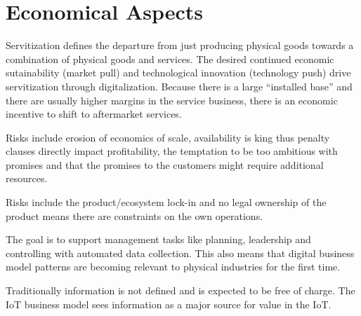 \section{Economical Aspects}
\begin{mytitle}[Servitization] Servitization defines the departure from just producing physical goods towards a combination of physical goods and services. The desired continued economic sutainability (market pull) and technological innovation (technology push) drive servitization through digitalization. Because there is a large ``installed base'' and there are usually higher margins in the service business, there is an economic incentive to shift to aftermarket services.
\end{mytitle}
\begin{mytitle}
    \begin{mysubtitle} Risks include erosion of economics of scale, availability is king thus penalty clauses directly impact profitability, the temptation to be too ambitious with promises and that the promises to the customers might require additional resources.
    \end{mysubtitle}
    \begin{mysubtitle} Risks include the product/ecosystem lock-in and no legal ownership of the product means there are constraints on the own operations.
    \end{mysubtitle}
\end{mytitle}

\begin{mytitle} The goal is to support management tasks like planning, leadership and controlling with automated data collection. This also means that digital business model patterns are becoming relevant to physical industries for the first time. 
\end{mytitle}
\begin{myremark} Traditionally information is not defined and is expected to be free of charge. The IoT business model sees information as a major source for value in the IoT.
\end{myremark}

